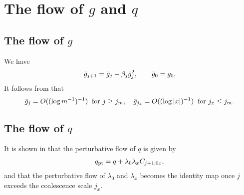 \section{The flow of \texorpdfstring{$g$}{g} and \texorpdfstring{$q$}{q}}


\subsection{The flow of \texorpdfstring{$g$}{g}}

We have
\begin{equation} \label{e:gbar}
  \bar{g}_{j+1}
  =
  \bar{g}_j
  -
  \beta_j  \bar{g}_j^{2}, \qquad \bar{g}_0 = g_0,
\end{equation}
It follows from \cite[Proposition~\ref{log-prop:approximate-flow}]{BBS-saw4-log} that
\begin{equation}
\label{e:gjxgjmbd}
\bar{g}_{j}
	=
O((\log m^{-1})^{-1}) \;\; \text{for $j \geq j_m$},
	\quad
\bar{g}_{j_x}
	=
O((\log |x|)^{-1}) \;\; \text{for $j_x \leq j_m$.}
\end{equation}


\subsection{The flow of \texorpdfstring{$q$}{q}}

It is shown in \cite[Proposition~\ref{phi4-prop:pt}]{ST-phi4}
that the perturbative flow of $q$ is given by
\begin{align}
\label{e:qpt}
q_{\rm pt} = q + \lambda_0 \lambda_x C_{j+1;0x},
\end{align}
and that the perturbative flow of $\lambda_0$ and $\lambda_x$ becomes the identity map
once $j$ exceeds the coalescence scale $j_x$.